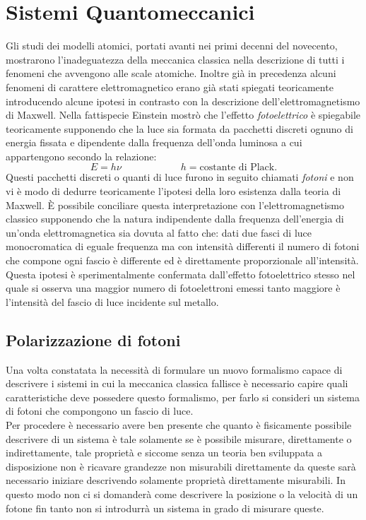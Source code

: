 \section{Sistemi Quantomeccanici}

Gli studi dei modelli atomici, portati avanti nei primi decenni del novecento, mostrarono l'inadeguatezza della meccanica classica nella descrizione di tutti i fenomeni che avvengono alle scale atomiche. Inoltre già in precedenza alcuni fenomeni di carattere elettromagnetico erano già stati spiegati teoricamente introducendo alcune ipotesi in contrasto con la descrizione dell'elettromagnetismo di Maxwell. Nella fattispecie Einstein mostrò che l'effetto \emph{fotoelettrico} è spiegabile teoricamente supponendo che la luce sia formata da pacchetti discreti ognuno di energia fissata e dipendente dalla frequenza dell'onda luminosa a cui appartengono secondo la relazione:
\begin{equation}
    E=h\nu\qquad\qquad\qquad h=\text{costante di Plack}. \label{relazione Planck}
\end{equation}  
Questi pacchetti discreti o quanti di luce furono in seguito chiamati \emph{fotoni} e non vi è modo di dedurre teoricamente l'ipotesi della loro esistenza dalla teoria di Maxwell. È possibile conciliare questa interpretazione con l'elettromagnetismo classico supponendo che la natura indipendente dalla frequenza dell'energia di un'onda elettromagnetica sia dovuta al fatto che: dati due fasci di luce monocromatica di eguale frequenza ma con intensità differenti il numero di fotoni che compone ogni fascio è differente ed è direttamente proporzionale all'intensità. Questa ipotesi è sperimentalmente confermata dall'effetto fotoelettrico stesso nel quale si osserva una maggior numero di fotoelettroni emessi tanto maggiore è l'intensità del fascio di luce incidente sul metallo.

\subsection{Polarizzazione di fotoni}

Una volta constatata la necessità di formulare un nuovo formalismo capace di descrivere i sistemi in cui la meccanica classica fallisce è necessario capire quali caratteristiche deve possedere questo formalismo, per farlo si consideri un sistema di fotoni che compongono un fascio di luce.\\ Per procedere è necessario avere ben presente che quanto è fisicamente possibile descrivere di un sistema è tale solamente se è possibile misurare, direttamente o indirettamente, tale proprietà e siccome senza un teoria ben sviluppata a disposizione non è ricavare grandezze non misurabili direttamente da queste sarà necessario iniziare descrivendo solamente proprietà direttamente misurabili. In questo modo non ci si domanderà come descrivere la posizione o la velocità di un fotone fin tanto non si introdurrà un sistema in grado di misurare queste.\\

